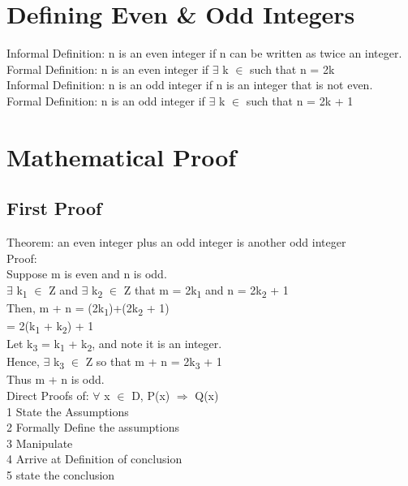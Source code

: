 \documentclass[11pt]{article}
\begin{document}
\section{Defining Even \& Odd Integers}
\label{sec:orga796aef}
Informal Definition: n is an even integer if n can be written as twice an integer.\\
Formal Definition: n is an even integer if \(\exists\) k \(\in\)  such that n = 2k\\

Informal Definition: n is an odd integer if n is an integer that is not even.\\
Formal Definition: n is an odd integer if \(\exists\) k \(\in\)  such that n = 2k + 1\\

\section{Mathematical Proof}
\label{sec:orga2f81b7}
\subsection{First Proof}
\label{sec:org371e699}
Theorem: an even integer plus an odd integer is another odd integer\\
Proof:\\
Suppose m is even and n is odd.\\
\(\exists\) k\textsubscript{1} \(\in\) Z and \(\exists\) k\textsubscript{2} \(\in\) Z that m = 2k\textsubscript{1} and n = 2k\textsubscript{2} + 1\\

Then, m + n = (2k\textsubscript{1})+(2k\textsubscript{2} + 1)\\
= 2(k\textsubscript{1} + k\textsubscript{2}) + 1\\
Let k\textsubscript{3} = k\textsubscript{1} + k\textsubscript{2}, and note it is an integer.\\

Hence, \(\exists\) k\textsubscript{3} \(\in\) Z so that m + n = 2k\textsubscript{3} + 1\\
Thus m + n is odd.\\

Direct Proofs of: \(\forall\) x \(\in\) D, P(x) \(\Rightarrow\) Q(x)\\
1 State the Assumptions\\
2 Formally Define the assumptions\\
3 Manipulate\\
4 Arrive at Definition of conclusion\\
5 state the conclusion\\
\end{document}
